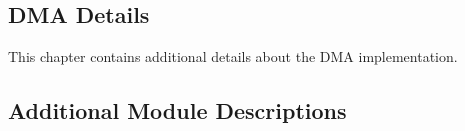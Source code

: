 \begin{appendix}

\chapter{DMA Details}

This chapter contains additional details about the DMA implementation.

\section{Additional Module Descriptions}

%
%
%

\end{appendix}
